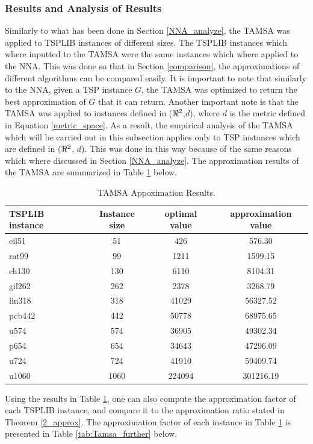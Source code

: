 \documentclass[12pt]{article}
\numberwithin{equation}{subsection}
\numberwithin{table}{subsection}
\numberwithin{algorithm}{subsection}
\numberwithin{figure}{subsection}
\begin{document}
\subsubsection{Results and Analysis of Results}
\label{tamsa_analysis}
Similarly to what has been done in Section \ref{NNA_analyze}, the TAMSA was applied to TSPLIB instances of different sizes. The TSPLIB instances which where inputted to the TAMSA were the same instances which where applied to the NNA. This was done so that in Section \ref{comparison}, the approximations of different algorithms can be compared easily. It is important to note that similarly to the NNA, given a TSP instance $G$, the TAMSA was optimized to return the best approximation of $G$ that it can return. Another important note is that the TAMSA was applied to instances defined in ($\real^2$,$d$), where $d$ is the metric defined in Equation \ref{metric_space}. As a result, the empirical analysis of the TAMSA which will be carried out in this subsection applies only to TSP instances which are defined in ($\real^2$, $d$). This was done in this way because of the same reasons which where discussed in Section \ref{NNA_analyze}. The approximation results of the TAMSA are summarized in Table \ref{tab:TAMSA_results} below. 
\begin{table}[H]
    \caption{TAMSA Appoximation Results.}
    \label{tab:TAMSA_results}
    \begin{tabular}{l|c|c|c} %
      \textbf{TSPLIB instance} & \textbf{Instance size} & \textbf{optimal value} & \textbf{approximation value}\\
      \hline
    eil51 & 51 & 426 & 576.30\\
    rat99 & 99 & 1211 & 1599.15\\
    ch130 & 130 & 6110 & 8104.31\\
    gil262 & 262 & 2378 & 3268.79\\
    lin318 & 318 & 41029 & 56327.52\\
    pcb442 & 442 & 50778 & 68975.65\\
    u574 & 574  & 36905 & 49302.34\\ 
    p654 & 654 & 34643 & 47296.09\\
    u724 & 724 & 41910 & 59409.74\\
    u1060 & 1060 & 224094 & 301216.19\\
    \end{tabular}
\end{table}
Using the results in Table \ref{tab:TAMSA_results}, one can also compute the approximation factor of each TSPLIB instance, and compare it to the approximation ratio stated in Theorem \ref{2_approx}. The approximation factor of each instance in Table \ref{tab:TAMSA_results} is presented in Table \ref{tab:Tamsa_further} below.
\end{document}
